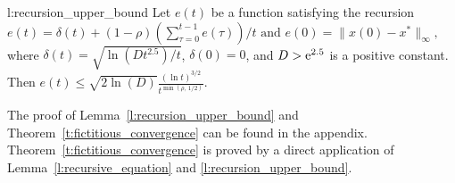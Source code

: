 \begin{replemma}{l:recursion_upper_bound}
  Let $e(t)$ be a function satisfying the recursion
  \(
    e(t) =
    \delta(t) + (1-\rho)(\sum_{\tau=0}^{t-1}e(\tau))/{t}
    \text{ and } e(0)=\|x(0) - x^*\|_{\infty},
  \)
  where \(\delta(t) = \sqrt{\ln(D t^{2.5})/t} \), \(\delta(0) = 0 \),
  and $D > \mathrm{e}^{2.5}$ is a positive constant.  Then
  \(
    e(t) \leq
    \sqrt{2 \ln(D)} \frac{(\ln t)^{3/2}}{t^{\min(\rho,\, 1/2)}}.
  \)
\end{replemma}
\noindent The proof of Lemma~\ref{l:recursion_upper_bound}
and Theorem~\ref{t:fictitious_convergence}
can be found in the appendix. Theorem~\ref{t:fictitious_convergence}
is proved by a direct application of Lemma~\ref{l:recursive_equation}
and \ref{l:recursion_upper_bound}.
